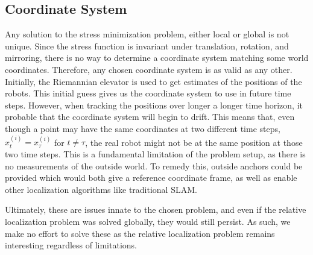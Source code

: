 \subsection{Coordinate System}
Any solution to the stress minimization problem, either local or global is not unique. Since the stress function is invariant under translation, rotation, and mirroring, there is no way to determine a coordinate system matching some world coordinates. Therefore, any chosen coordinate system is as valid as any other. Initially, the Riemannian elevator is used to get estimates of the positions of the robots. This initial guess gives us the coordinate system to use in future time steps. However, when tracking the positions over longer a longer time horizon, it probable that the coordinate system will begin to drift. This means that, even though a point may have the same coordinates at two different time steps, $x^{(i)}_t = x^{(i)}_\tau$ for $t \neq \tau$, the real robot might not be at the same position at those two time steps. This is a fundamental limitation of the problem setup, as there is no measurements of the outside world. To remedy this, outside anchors could be provided which would both give a reference coordinate frame, as well as enable other localization algorithms like traditional SLAM. 

Ultimately, these are issues innate to the chosen problem, and even if the relative localization problem was solved globally, they would still persist. As such, we make no effort to solve these as the relative localization problem remains interesting regardless of limitations.


